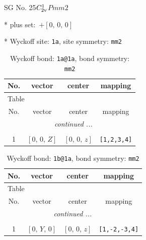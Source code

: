 \documentclass[fleqn,8pt]{jsarticle}
\begin{document}
\setcounter{MaxMatrixCols}{32}

\renewcommand{\tablename}{Table~}
\renewcommand{\figurename}{Figure~}
\begin{center}
\LARGE
SG No. 25\quad$C_{\rm 2v}^{1}$\quad$Pmm2$\quad[ orthorhombic ]
\end{center}

* plus set:\,\,\,$+\left[ 0,\, 0,\, 0 \right]$


* Wyckoff site: {\tt 1a}, site symmetry: {\tt mm2}
\renewcommand{\arraystretch}{1.2}
\begin{longtable}{cccc}
\caption{Wyckoff bond: {\tt 1a@1a}, bond symmetry: {\tt mm2}}
 \\
 \hline \hline
No. & vector & center & mapping \\ \hline \endfirsthead

\multicolumn{3}{l}{\tablename\ \thetable{}} \\
 \hline \hline
No. & vector & center & mapping \\ \hline \endhead

 \hline \hline
\multicolumn{3}{r}{\footnotesize\it continued ...} \\ \endfoot

 \hline \hline
\multicolumn{3}{r}{} \\ \endlastfoot

1 & $\left[ 0,\, 0,\, Z \right]$ & $\left[ 0,\, 0,\, z \right]$ & {\tt [1,2,3,4]} \\
\end{longtable}
\renewcommand{\arraystretch}{1.2}
\begin{longtable}{cccc}
\caption{Wyckoff bond: {\tt 1b@1a}, bond symmetry: {\tt mm2}}
 \\
 \hline \hline
No. & vector & center & mapping \\ \hline \endfirsthead

\multicolumn{3}{l}{\tablename\ \thetable{}} \\
 \hline \hline
No. & vector & center & mapping \\ \hline \endhead

 \hline \hline
\multicolumn{3}{r}{\footnotesize\it continued ...} \\ \endfoot

 \hline \hline
\multicolumn{3}{r}{} \\ \endlastfoot

1 & $\left[ 0,\, Y,\, 0 \right]$ & $\left[ 0,\, 0,\, z \right]$ & {\tt [1,-2,-3,4]} \\
\end{longtable}
\end{document}
